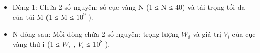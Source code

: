 \begin{itemize}
	\item     Dòng 1: Chứa 2 số nguyên: số cục vàng N (1 ≤ N ≤ 40) và tải trọng tối đa của túi M (1 ≤ M ≤ $10^{9}$    ).   
	\item     N dòng sau: Mỗi dòng chứa 2 số nguyên: trọng lượng $W_{i}$    và giá trị $V_{i}$    của cục vàng thứ i (1 ≤ $W_{i}$    , $V_{i}$    ≤ $10^{8}$    ).   
\end{itemize}